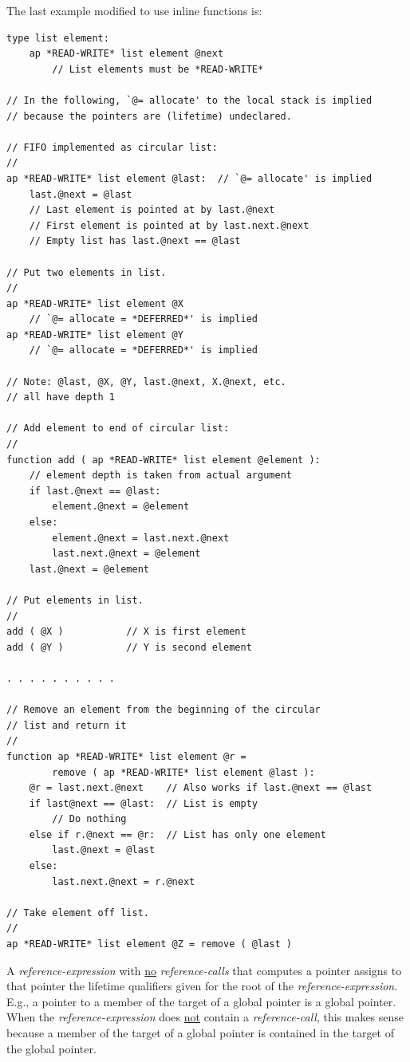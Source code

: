\documentclass[12pt]{article}
\newenvironment{indpar}[1][0.3in]%
	{\begin{list}{}%
		     {\setlength{\itemsep}{0in}%
		      \setlength{\topsep}{0in}%
		      \setlength{\parsep}{1ex}%
		      \setlength{\labelwidth}{#1}%
		      \setlength{\leftmargin}{#1}%
		      \addtolength{\leftmargin}{\labelsep}}%
	 \item}%
	{\end{list}}
\begin{document}
The last example modified to use inline functions is:
\begin{indpar}\begin{verbatim}
type list element:
    ap *READ-WRITE* list element @next
        // List elements must be *READ-WRITE*

// In the following, `@= allocate' to the local stack is implied
// because the pointers are (lifetime) undeclared.

// FIFO implemented as circular list:
//
ap *READ-WRITE* list element @last:  // `@= allocate' is implied
    last.@next = @last
    // Last element is pointed at by last.@next
    // First element is pointed at by last.next.@next
    // Empty list has last.@next == @last

// Put two elements in list.
//
ap *READ-WRITE* list element @X
    // `@= allocate = *DEFERRED*' is implied
ap *READ-WRITE* list element @Y
    // `@= allocate = *DEFERRED*' is implied

// Note: @last, @X, @Y, last.@next, X.@next, etc.
// all have depth 1

// Add element to end of circular list:
//
function add ( ap *READ-WRITE* list element @element ):
    // element depth is taken from actual argument
    if last.@next == @last:
        element.@next = @element
    else:
        element.@next = last.next.@next
        last.next.@next = @element
    last.@next = @element

// Put elements in list.
//
add ( @X )           // X is first element
add ( @Y )           // Y is second element

. . . . . . . . . .

// Remove an element from the beginning of the circular
// list and return it
//
function ap *READ-WRITE* list element @r =
        remove ( ap *READ-WRITE* list element @last ):
    @r = last.next.@next    // Also works if last.@next == @last
    if last@next == @last:  // List is empty
        // Do nothing
    else if r.@next == @r:  // List has only one element
        last.@next = @last
    else:
        last.next.@next = r.@next

// Take element off list.
//
ap *READ-WRITE* list element @Z = remove ( @last ) 
\end{verbatim}\end{indpar}

A {\em reference-expression} with \underline{no} {\em reference-calls}
that computes a pointer assigns to that
pointer the lifetime qualifiers given for the root of the
{\em reference-expression}.  E.g., a pointer to a member of the
target of a global pointer is a global pointer.  When the
{\em reference-expression} does \underline{not} contain a
{\em reference-call}, this makes sense because a member of the
target of a global pointer is contained in the target of the global
pointer.
\end{document}

